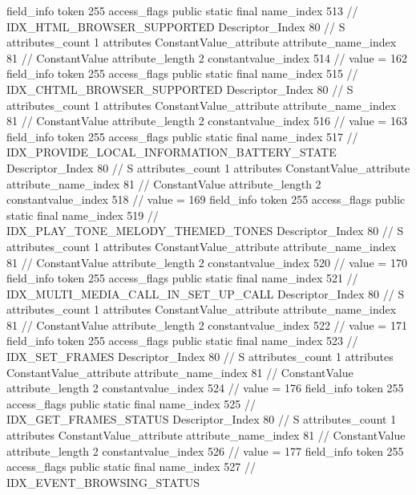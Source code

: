{{{{{{{				}
				}
			}
			field_info {
				token	255
				access_flags	public static final
				name_index	513		// IDX_HTML_BROWSER_SUPPORTED
				Descriptor_Index	80		// S
				attributes_count	1
				attributes {
				ConstantValue_attribute {
					attribute_name_index	81		// ConstantValue
					attribute_length	2
					constantvalue_index	514		// value = 162
				}
				}
			}
			field_info {
				token	255
				access_flags	public static final
				name_index	515		// IDX_CHTML_BROWSER_SUPPORTED
				Descriptor_Index	80		// S
				attributes_count	1
				attributes {
				ConstantValue_attribute {
					attribute_name_index	81		// ConstantValue
					attribute_length	2
					constantvalue_index	516		// value = 163
				}
				}
			}
			field_info {
				token	255
				access_flags	public static final
				name_index	517		// IDX_PROVIDE_LOCAL_INFORMATION_BATTERY_STATE
				Descriptor_Index	80		// S
				attributes_count	1
				attributes {
				ConstantValue_attribute {
					attribute_name_index	81		// ConstantValue
					attribute_length	2
					constantvalue_index	518		// value = 169
				}
				}
			}
			field_info {
				token	255
				access_flags	public static final
				name_index	519		// IDX_PLAY_TONE_MELODY_THEMED_TONES
				Descriptor_Index	80		// S
				attributes_count	1
				attributes {
				ConstantValue_attribute {
					attribute_name_index	81		// ConstantValue
					attribute_length	2
					constantvalue_index	520		// value = 170
				}
				}
			}
			field_info {
				token	255
				access_flags	public static final
				name_index	521		// IDX_MULTI_MEDIA_CALL_IN_SET_UP_CALL
				Descriptor_Index	80		// S
				attributes_count	1
				attributes {
				ConstantValue_attribute {
					attribute_name_index	81		// ConstantValue
					attribute_length	2
					constantvalue_index	522		// value = 171
				}
				}
			}
			field_info {
				token	255
				access_flags	public static final
				name_index	523		// IDX_SET_FRAMES
				Descriptor_Index	80		// S
				attributes_count	1
				attributes {
				ConstantValue_attribute {
					attribute_name_index	81		// ConstantValue
					attribute_length	2
					constantvalue_index	524		// value = 176
				}
				}
			}
			field_info {
				token	255
				access_flags	public static final
				name_index	525		// IDX_GET_FRAMES_STATUS
				Descriptor_Index	80		// S
				attributes_count	1
				attributes {
				ConstantValue_attribute {
					attribute_name_index	81		// ConstantValue
					attribute_length	2
					constantvalue_index	526		// value = 177
				}
				}
			}
			field_info {
				token	255
				access_flags	public static final
				name_index	527		// IDX_EVENT_BROWSING_STATUS
}}}}}
